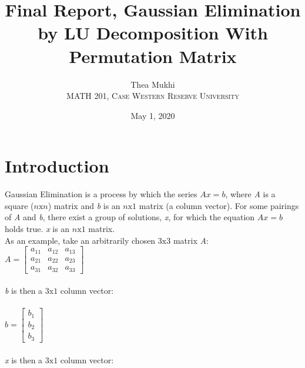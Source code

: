 \documentclass{article}
\title{Final Report, Gaussian Elimination by LU Decomposition With Permutation Matrix}
\author{Thea Mukhi\\
MATH 201, \textsc{Case Western Reserve University}
}
\date{May 1, 2020}
\begin{document}
\maketitle
\tableofcontents
\pagebreak

\section{Introduction}
Gaussian Elimination is a process by which the series \begin{math}Ax=b\end{math}, where \emph{A} is a square (\begin{math}n\text{x}n\end{math}) matrix and \emph{b} is an \begin{math}n\text{x}1\end{math} matrix (a column vector). For some pairings of \emph{A} and \emph{b}, there exist a group of solutions, \emph{x}, for which the equation \begin{math}Ax=b\end{math} holds true. \emph{x} is an \begin{math}n\text{x}1\end{math} matrix.\\
As an example, take an arbitrarily chosen \begin{math}3\text{x}3\end{math} matrix \emph{A}:\\
\begin{math}A = \begin{bmatrix}a_{11}&a_{12}&a_{13}\\a_{21}&a_{22}&a_{23}\\a_{31}&a_{32}&a_{33}\end{bmatrix}\end{math}\\\\
\emph{b} is then a \begin{math}3\text{x}1\end{math} column vector:\\\\
\begin{math}b=\begin{bmatrix}b_{1}\\b_{2}\\b_{3}\end{bmatrix}\end{math}\\\\
\emph{x} is then a \begin{math}3\text{x}1\end{math} column vector: \\\\
\end{document}
